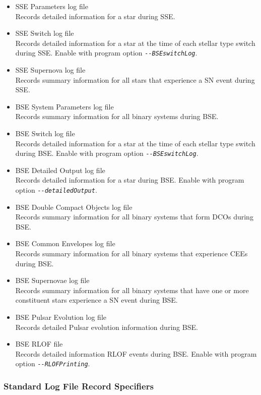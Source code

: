 \begin{itemize}
\itemsep0pt
\item{SSE Parameters log file \\ Records detailed information for a star during SSE.}
\item{SSE Switch log file \\ Records detailed information for a star at the time of each stellar type switch during SSE. Enable with program option \textit{\texttt{-{}-{BSEswitchLog}}}.}
\item{SSE Supernova log file \\ Records summary information for all stars that experience a SN event during SSE.}
\item{BSE System Parameters log file \\ Records summary information for all binary systems during BSE.}
\item{BSE Switch log file \\ Records detailed information for a star at the time of each stellar type switch during BSE. Enable with program option \textit{\texttt{-{}-{BSEswitchLog}}}.}
\item{BSE Detailed Output log file \\ Records detailed information for a star during BSE. Enable with program option \textit{\texttt{-{}-{detailedOutput}}}.}
\item{BSE Double Compact Objects log file \\ Records summary information for all binary systems that form DCOs during BSE.}
\item{BSE Common Envelopes log file \\ Records summary information for all binary systems that experience CEEs during BSE.}
\item{BSE Supernovae log file \\ Records summary information for all binary systems that have one or more constituent stars experience a SN event during BSE.}
\item{BSE Pulsar Evolution log file \\ Records detailed Pulsar evolution information during BSE.}
\item{BSE RLOF file \\ Records detailed information RLOF events during BSE. Enable with program option \textit{\texttt{-{}-{RLOFPrinting}}}.}
\end{itemize}

\newpage
\subsubsection{Standard Log File Record Specifiers}\label{sec:StandardLogFileRecordSpecifiers}

